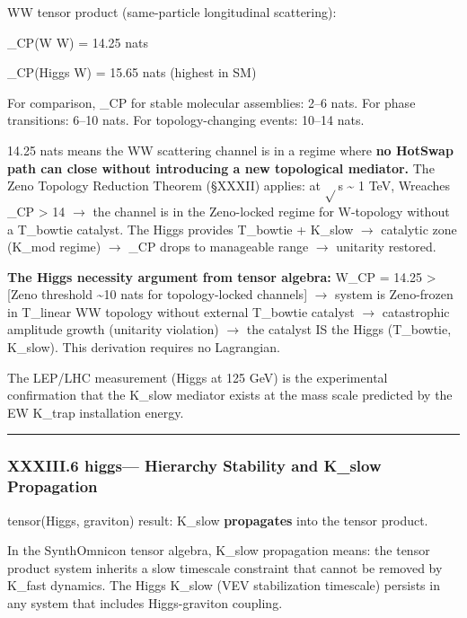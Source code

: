 \documentclass[12pt,a4paper]{article}
\begin{document}
WW tensor product (same-particle longitudinal scattering):

\xi\_CP(W \otimes W) = 14.25 nats

\xi\_CP(Higgs \otimes W) = 15.65 nats (highest in SM)

For comparison, \xi\_CP for stable molecular assemblies: 2--6 nats. For phase transitions: 6--10 nats. For topology-changing events: 10--14 nats.

14.25 nats means the WW scattering channel is in a regime where \textbf{no HotSwap path can close without introducing a new topological mediator.} The Zeno Topology Reduction Theorem (§XXXII) applies: at $\sqrt{}$s \textasciitilde{} 1 TeV, W\otimesW reaches \xi\_CP \textgreater{} 14 $\rightarrow$ the channel is in the Zeno-locked regime for W-topology without a T\_bowtie catalyst. The Higgs provides T\_bowtie + K\_slow $\rightarrow$ catalytic zone (K\_mod regime) $\rightarrow$ \xi\_CP drops to manageable range $\rightarrow$ unitarity restored.

\textbf{The Higgs necessity argument from tensor algebra:} W\otimesW \xi\_CP = 14.25 \textgreater{} {[}Zeno threshold \textasciitilde{}10 nats for topology-locked channels{]} $\rightarrow$ system is Zeno-frozen in T\_linear WW topology without external T\_bowtie catalyst $\rightarrow$ catastrophic amplitude growth (unitarity violation) $\rightarrow$ the catalyst IS the Higgs (T\_bowtie, K\_slow). This derivation requires no Lagrangian.

The LEP/LHC measurement (Higgs at 125 GeV) is the experimental confirmation that the K\_slow mediator exists at the mass scale predicted by the EW K\_trap installation energy.

\begin{center}
\rule{0.5\textwidth}{0.4pt}
\end{center}

\subsubsection{XXXIII.6 higgs\otimesgraviton --- Hierarchy Stability and K\_slow Propagation}

tensor(Higgs, graviton) result: K\_slow \textbf{propagates} into the tensor product.

In the SynthOmnicon tensor algebra, K\_slow propagation means: the tensor product system inherits a slow timescale constraint that cannot be removed by K\_fast dynamics. The Higgs K\_slow (VEV stabilization timescale) persists in any system that includes Higgs-graviton coupling.
\end{document}
